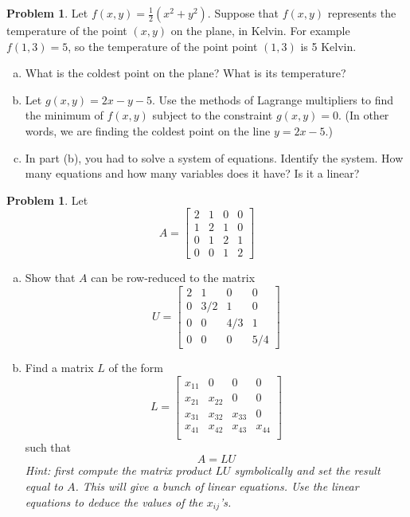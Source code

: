 \documentclass[10pt]{article}
\theoremstyle{definition}
\newtheorem{problem}[theorem]{Problem}
\newcommand{\1}[1]{\textbf{1}_{\left[#1\right]}} %
\begin{document}
\begin{problem}
  Let $f(x,y) = \frac{1}{2}(x^{2}+y^{2})$. Suppose that $f(x,y)$ represents
  the temperature of the point $(x,y)$ on the plane, in Kelvin. For example $f(1,3) =5$,
  so the temperature of the point point $(1,3)$ is 5 Kelvin.
  \begin{enumerate}[(a)]
    \item What is the coldest point on the plane? What is its temperature?
    \item Let $g(x,y)= 2x-y-5$. Use the methods of Lagrange multipliers to
    find the minimum of $f(x,y)$ subject to the constraint $g(x,y)=0$. (In
    other words, we are finding the coldest point on the line $y=2x-5$.)
    \item In part (b), you had to solve a system of equations. Identify the
    system. How many equations and how many variables does it have? Is it a
    linear?
  \end{enumerate}
\end{problem}

\begin{problem}
  Let
  \begin{equation*}
    A =
    \begin{bmatrix}
      2&1&0&0\\
      1&2&1&0\\
      0&1&2&1\\
      0&0&1&2
    \end{bmatrix}
  \end{equation*}
  \begin{enumerate}[(a)]
    \item Show that $A$ can be row-reduced to the matrix
    \begin{equation*}
      U =
      \begin{bmatrix}
        2&1&0&0\\
        0&3/2&1&0\\
        0&0&4/3&1\\
        0&0&0&5/4
      \end{bmatrix}
    \end{equation*}
    \item Find a matrix $L$ of the form
    \begin{equation*}
      L =
      \begin{bmatrix}
        x_{11}&0&0&0\\
        x_{21}&x_{22}&0&0\\
        x_{31}&x_{32}&x_{33}&0\\
        x_{41}&x_{42}&x_{43}&x_{44}\\
      \end{bmatrix}
    \end{equation*}
    such that
    \begin{equation*}
      A = LU
    \end{equation*}
    \textit{Hint: first compute the matrix product $LU$ symbolically and set
      the result equal to $A$. This will give a bunch of linear equations. Use
      the linear equations to deduce the values of the $x_{ij}$'s.}
  \end{enumerate}
\end{problem}
\end{document}
